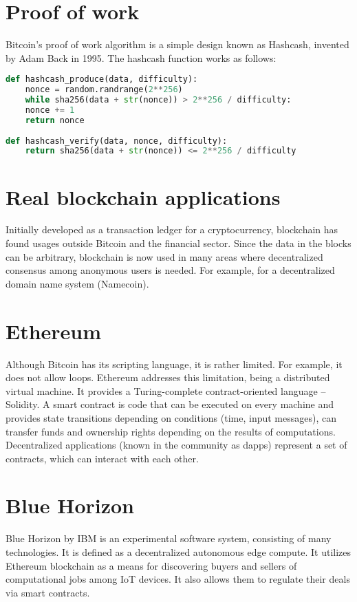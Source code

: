 \documentclass{article}
\begin{document}
\section{Proof of work}
Bitcoin's proof of work algorithm is a simple design known as Hashcash, invented by Adam Back in 1995. The hashcash function works as follows:

\begin{lstlisting}[language=Python]
def hashcash_produce(data, difficulty):
    nonce = random.randrange(2**256)
    while sha256(data + str(nonce)) > 2**256 / difficulty:
    nonce += 1
    return nonce
    
def hashcash_verify(data, nonce, difficulty):
    return sha256(data + str(nonce)) <= 2**256 / difficulty
\end{lstlisting}

\section{Real blockchain applications}
Initially developed as a transaction ledger for a cryptocurrency, blockchain has found usages outside Bitcoin and the financial sector. Since the data in the blocks can be arbitrary, blockchain is now used in many areas where decentralized consensus among anonymous users is needed. For example, for a decentralized domain name system (Namecoin).

\section{Ethereum}
Although Bitcoin has its scripting language, it is rather limited. For example, it does not allow loops. Ethereum addresses this limitation, being a distributed virtual machine. It provides a Turing-complete contract-oriented language – Solidity. A smart contract is code that can be executed on every machine and provides state transitions depending on conditions (time, input messages), can transfer funds and ownership rights depending on the results of computations. Decentralized applications (known in the community as dapps) represent a set of contracts, which can interact with each other.

\section{Blue Horizon}
Blue Horizon by IBM is an experimental software system, consisting of many technologies. It is defined as a decentralized autonomous edge compute. It utilizes Ethereum blockchain as a means for discovering buyers and sellers of computational jobs among IoT devices. It also allows them to regulate their deals via smart contracts.
\end{document}
